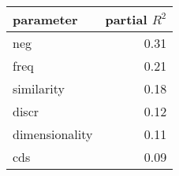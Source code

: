 \begin{tabular}{lr}
\toprule
      parameter &  partial $R^2$ \\
\midrule
            neg &  0.31 \\
           freq &  0.21 \\
     similarity &  0.18 \\
          discr &  0.12 \\
 dimensionality &  0.11 \\
            cds &  0.09 \\
\bottomrule
\end{tabular}
